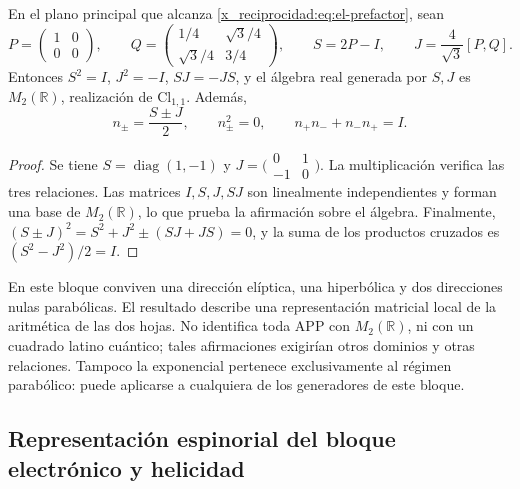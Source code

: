 \begin{proposition}
En el plano principal que alcanza \eqref{x_reciprocidad:eq:el-prefactor}, sean
\[
 P=\begin{pmatrix}1&0\\0&0\end{pmatrix},\qquad
 Q=\begin{pmatrix}1/4&\sqrt3/4\\\sqrt3/4&3/4\end{pmatrix},\qquad
 S=2P-I,\qquad J=\frac4{\sqrt3}[P,Q].
\]
Entonces \(S^2=I\), \(J^2=-I\), \(SJ=-JS\), y el álgebra real
generada por \(S,J\) es \(M_2(\mathbb R)\), realización de
\(\mathrm{Cl}_{1,1}\). Además,
\[
 n_\pm=\frac{S\pm J}{2},\qquad
 n_\pm^2=0,\qquad n_+n_-+n_-n_+=I.
\]
\end{proposition}
\begin{proof}
Se tiene \(S=\operatorname{diag}(1,-1)\) y
\(J=\bigl(\begin{smallmatrix}0&1\\-1&0\end{smallmatrix}\bigr)\).
La multiplicación verifica las tres relaciones. Las matrices
\(I,S,J,SJ\) son linealmente independientes y forman una base de
\(M_2(\mathbb R)\), lo que prueba la afirmación sobre el álgebra.
Finalmente, \((S\pm J)^2=S^2+J^2\pm(SJ+JS)=0\), y la suma de los
productos cruzados es \((S^2-J^2)/2=I\).
\end{proof}

En este bloque conviven una dirección elíptica, una hiperbólica y dos
direcciones nulas parabólicas. El resultado describe una representación
matricial local de la aritmética de las dos hojas. No identifica toda APP
con \(M_2(\mathbb R)\), ni con un cuadrado latino cuántico; tales
afirmaciones exigirían otros dominios y otras relaciones. Tampoco la
exponencial pertenece exclusivamente al régimen parabólico: puede
aplicarse a cualquiera de los generadores de este bloque.


\subsection{Representación espinorial del bloque electrónico y helicidad}
\label{x_reciprocidad:sec:el-representacion-espinorial}

